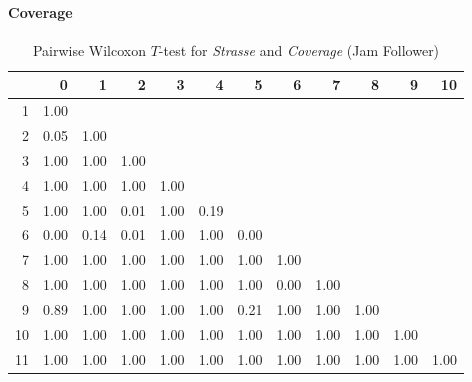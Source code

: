 
\paragraph{Coverage}

\begin{table}[ht]
	\tiny
	\centering
	\begin{tabular}{rrrrrrrrrrrr}
		\hline
		  & 0 & 1 & 2 & 3 & 4 & 5 & 6 & 7 & 8 & 9 & 10 \\ 
		\hline
		1 & 1.00 &  &  &  &  &  &  &  &  &  &  \\ 
		2 & 0.05 & 1.00 &  &  &  &  &  &  &  &  &  \\ 
		3 & 1.00 & 1.00 & 1.00 &  &  &  &  &  &  &  &  \\ 
		4 & 1.00 & 1.00 & 1.00 & 1.00 &  &  &  &  &  &  &  \\ 
		5 & 1.00 & 1.00 & 0.01 & 1.00 & 0.19 &  &  &  &  &  &  \\ 
		6 & 0.00 & 0.14 & 0.01 & 1.00 & 1.00 & 0.00 &  &  &  &  &  \\ 
		7 & 1.00 & 1.00 & 1.00 & 1.00 & 1.00 & 1.00 & 1.00 &  &  &  &  \\ 
		8 & 1.00 & 1.00 & 1.00 & 1.00 & 1.00 & 1.00 & 0.00 & 1.00 &  &  &  \\ 
		9 & 0.89 & 1.00 & 1.00 & 1.00 & 1.00 & 0.21 & 1.00 & 1.00 & 1.00 &  &  \\ 
		10 & 1.00 & 1.00 & 1.00 & 1.00 & 1.00 & 1.00 & 1.00 & 1.00 & 1.00 & 1.00 &  \\ 
		11 & 1.00 & 1.00 & 1.00 & 1.00 & 1.00 & 1.00 & 1.00 & 1.00 & 1.00 & 1.00 & 1.00 \\ 
		\hline
	  \end{tabular}
    \caption{Pairwise Wilcoxon $T$-test for \textit{Strasse} and \textit{Coverage} (Jam Follower)}
    \label{tbl:wilcoxon_baysis_follower_Strasse_Cov}
\end{table}
